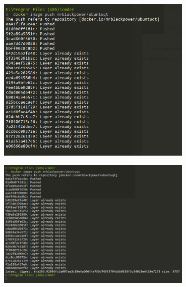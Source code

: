 \documentclass[10pt]{beamer}
\theoremstyle{remark}
\theoremstyle{definition}
\begin{document}
\begin{frame}[allowframebreaks]
	\begin{center}
		\includegraphics[width=0.7\textwidth]{images/18.png}
	\end{center}
	
	\framebreak
	
	\begin{center}
		\includegraphics[width=0.7\textwidth]{images/19.png}
	\end{center}

\end{frame}
\end{document}
